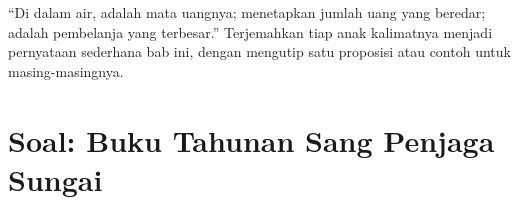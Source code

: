 \begin{exercise}[$\star\star\star$]\label{exo:g7:oxygen-in-the-water:12}
``Di dalam air,  adalah mata uangnya;  menetapkan jumlah
uang yang beredar;  adalah pembelanja yang terbesar.''
Terjemahkan tiap anak kalimatnya menjadi pernyataan sederhana bab ini,
dengan mengutip satu proposisi atau contoh untuk masing-masingnya.
\end{exercise}

\section{Soal: Buku Tahunan Sang Penjaga Sungai}

